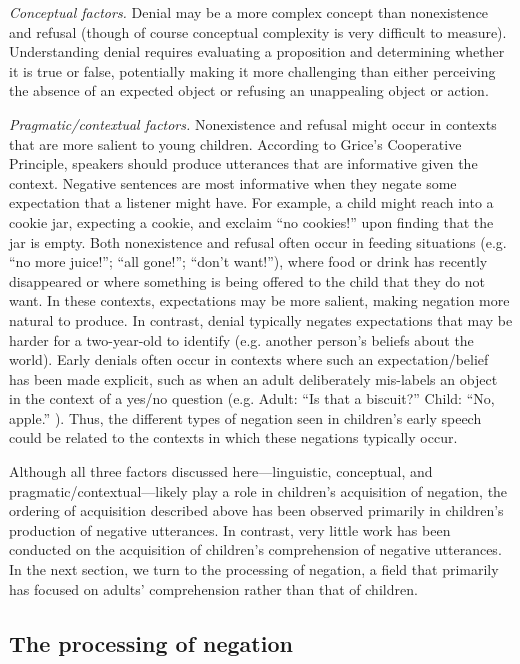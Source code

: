 \documentclass[man]{apa2}
\begin{document}
{\it Conceptual factors.} Denial may be a more complex concept than nonexistence and refusal (though of course conceptual complexity is very difficult to measure). Understanding denial requires evaluating a proposition and determining whether it is true or false, potentially making it more challenging than either perceiving the absence of an expected object or refusing an unappealing object or action.

{\it Pragmatic/contextual factors.} Nonexistence and refusal might occur in contexts that are more salient to young children. According to Grice's \citeyear{Grice1975} Cooperative Principle, speakers should produce utterances that are informative given the context.  Negative sentences are most informative when they negate some expectation that a listener might have.  For example, a child might reach into a cookie jar, expecting a cookie, and exclaim ``no cookies!'' upon finding that the jar is empty.  Both nonexistence and refusal often occur in feeding situations  (e.g. ``no more juice!''; ``all gone!''; ``don't want!''), where food or drink has recently disappeared or where something is being offered to the child that they do not want.  In these contexts, expectations may be more salient, making negation more natural to produce. In contrast, denial typically negates expectations that may be harder for a two-year-old to identify (e.g. another person's beliefs about the world). Early denials often occur in contexts where such an expectation/belief has been made explicit, such as when an adult deliberately mis-labels an object in the context of a yes/no question (e.g. Adult: ``Is that a biscuit?'' Child: ``No, apple.'' ).  Thus, the different types of negation seen in children's early speech could be related to the contexts in which these negations typically occur.  

Although all three factors discussed here---linguistic, conceptual, and pragmatic/contextual---likely play a role in children's acquisition of negation, the ordering of acquisition described above has been observed primarily in children's production of negative utterances. In contrast, very little work has been conducted on the acquisition of children's comprehension of negative utterances.  In the next section, we turn to the processing of negation, a field that primarily has focused on adults' comprehension rather than that of children.

\subsection{The processing of negation}
\end{document}
